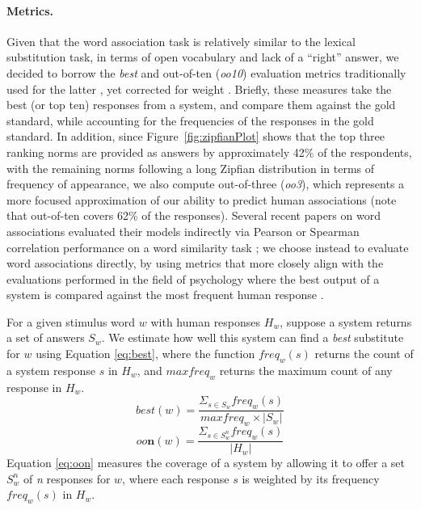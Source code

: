 \documentclass[11pt,letterpaper]{article}
\newcommand{\figref}[1]{Figure~\ref{#1}} %
\begin{document}
\paragraph{Metrics.}
Given that the word association task is relatively similar to the lexical substitution task, in terms of open vocabulary and lack of a ``right'' answer, we decided to borrow the {\it best} and out-of-ten ({\it oo10}) evaluation metrics traditionally used for the latter \cite{McCarthy2009}, yet corrected for weight \cite{Jabbari2010}. Briefly, these measures take the best (or top ten) responses from a system, and compare them against  the gold standard, while accounting for the frequencies of the responses in the gold standard. In addition, since \figref{fig:zipfianPlot} shows that the top three ranking norms are provided as answers by approximately 42\% of the respondents, with the remaining norms following a long Zipfian distribution in terms of frequency of appearance, we also compute out-of-three ({\it oo3}), which represents a more focused approximation of our ability to predict human associations (note that out-of-ten covers 62\% of the responses).
 Several recent papers on word associations evaluated their models indirectly via Pearson or Spearman correlation performance on a word similarity task \cite{Chaudhari11,Deyne16}; we choose instead to evaluate word associations directly, by using metrics that more closely align with the evaluations performed in the field of psychology where the best output of a system is compared against the most frequent human response \cite{Bel14,Mohammad11}.


For a given stimulus word $w$ with human responses $H_{w}$, suppose a system returns a set of answers $S_{w}$. 
We estimate how well this system can find a \textit{best} substitute for $w$ using Equation \ref{eq:best}, where the function $freq_{w}(s)$ returns the count of a system response $s$ in $H_{w}$, and $maxfreq_{w}$ returns the maximum count of any response in $H_{w}$.
\begin{equation}
    best(w) = \frac{\Sigma_{s \in S_{w}}freq_{w}(s)}{maxfreq_{w} \times |S_{w}|}
    \label{eq:best}
\end{equation}
\begin{equation}
    oo\textbf{n}(w) = \frac{\Sigma_{s \in S_{w}^{n}}freq_{w}(s)}{|H_{w}|}
    \label{eq:oon}
\end{equation}
Equation \ref{eq:oon} measures the coverage of a system by allowing it to offer a set $S_{w}^{n}$ of \textit{n} responses for $w$, where each response $s$ is weighted by its frequency $freq_{w}(s)$ in $H_{w}$.
\end{document}
